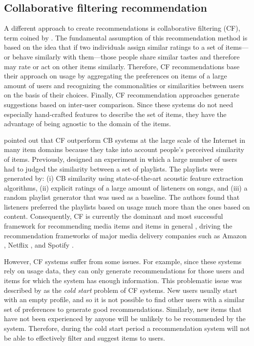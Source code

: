 \subsection{Collaborative filtering recommendation}\label{sub:collaborative}
A different approach to create recommendations is collaborative filtering (CF), term coined by \textcite{goldberg92using}. The fundamental assumption of this recommendation method is based on the idea that if two individuals assign similar ratings to a set of items---or behave similarly with them---those people share similar tastes and therefore may rate or act on other items similarly. 
Therefore, CF recommendations base their approach on usage by aggregating the preferences on items of a large amount of users and  recognizing the commonalities or similarities between users on the basis of their choices. Finally, CF recommendation approaches generate suggestions based on inter-user comparison.
Since these systems do not need especially hand-crafted features to describe the set of items, they have the advantage of being agnostic to the domain of the items.

\textcite{slaney11web} pointed out that CF outperform CB systems at the large scale of the Internet in many item domains because they take into account people's perceived similarity of items. Previously, \textcite{slaney07similarity} designed an experiment in which a large number of users had to judged the similarity between a set of playlists. 
The playlists were generated by: (i) CB similarity using state-of-the-art acoustic feature extraction algorithms, (ii) explicit ratings of a large amount of listeners on songs, and (iii) a random playlist generator that was used as a baseline.
The authors found that listeners preferred the playlists based on usage much more than the ones based on content.
Consequently, CF is currently the dominant and most successful framework for recommending media items and items in general \autocite{shi14collaborative}, driving the recommendation frameworks of major media delivery companies such as Amazon \autocite{linden03amazon}, Netflix \autocite{gomez15netflix}, and Spotify \autocite{johnson14logistic}.


However, CF systems suffer from some issues. For example, since these systems rely on usage data, they can only generate recommendations for those users and items for which the system has enough information. This problematic issue was described by \textcite{maltz95pointing} as the \textit{cold start} problem of CF systems. New users usually start with an empty profile, and so it is not possible to find other users with a similar set of preferences to generate good recommendations. Similarly, new items that have not been experienced by anyone will be unlikely to be recommended by the system. Therefore, during the cold start period a recommendation system will not be able to effectively filter and suggest items to users. 

